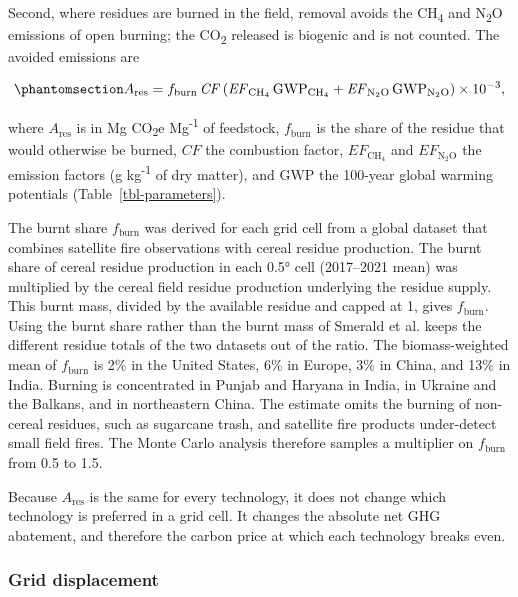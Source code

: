 \documentclass[
  letterpaper,
  twoside,
  twocolumn,
  9pt]{article}
\begin{document}
Second, where residues are burned in the field, removal avoids the
CH\textsubscript{4} and N\textsubscript{2}O emissions of open burning;
the CO\textsubscript{2} released is biogenic and is not counted. The
avoided emissions are

\begin{equation}\phantomsection\label{eq-burn}{A_{\mathrm{res}} = f_{\mathrm{burn}}\, \mathit{CF} \left( \mathit{EF}_{\mathrm{CH_4}}\, \mathrm{GWP}_{\mathrm{CH_4}} + \mathit{EF}_{\mathrm{N_2O}}\, \mathrm{GWP}_{\mathrm{N_2O}} \right) \times 10^{-3},}\end{equation}

where \(A_{\mathrm{res}}\) is in Mg CO\textsubscript{2}e
Mg\textsuperscript{-1} of feedstock, \(f_{\mathrm{burn}}\) is the share
of the residue that would otherwise be burned, \(\mathit{CF}\) the
combustion factor, \(\mathit{EF}_{\mathrm{CH_4}}\) and
\(\mathit{EF}_{\mathrm{N_2O}}\) the emission factors (g
kg\textsuperscript{-1} of dry matter),\citep{ipcc2006} and
\(\mathrm{GWP}\) the 100-year global warming potentials
\citep{forster2021} (Table~\ref{tbl-parameters}).

The burnt share \(f_{\mathrm{burn}}\) was derived for each grid cell
from a global dataset that combines satellite fire observations with
cereal residue production.\citep{smerald2023} The burnt share of cereal
residue production in each 0.5° cell (2017--2021 mean) was multiplied by
the cereal field residue production underlying the residue
supply.\citep{karan2023} This burnt mass, divided by the available
residue and capped at 1, gives \(f_{\mathrm{burn}}\). Using the burnt
share rather than the burnt mass of Smerald et al.\citep{smerald2023}
keeps the different residue totals of the two datasets out of the ratio.
The biomass-weighted mean of \(f_{\mathrm{burn}}\) is 2\% in the United
States, 6\% in Europe, 3\% in China, and 13\% in India. Burning is
concentrated in Punjab and Haryana in India, in Ukraine and the Balkans,
and in northeastern China. The estimate omits the burning of non-cereal
residues, such as sugarcane trash, and satellite fire products
under-detect small field fires. The Monte Carlo analysis therefore
samples a multiplier on \(f_{\mathrm{burn}}\) from 0.5 to 1.5.

Because \(A_{\mathrm{res}}\) is the same for every technology, it does
not change which technology is preferred in a grid cell. It changes the
absolute net GHG abatement, and therefore the carbon price at which each
technology breaks even.

\subsubsection{Grid displacement}\label{grid-displacement}
\end{document}
